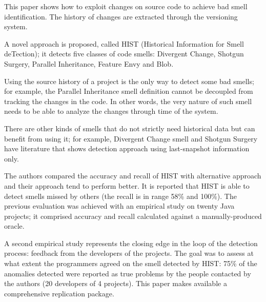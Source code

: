 This paper shows how to exploit changes on source code to achieve bad smell identification. The history of changes are extracted through the versioning system. 

A novel approach is proposed, called HIST (Historical Information for Smell deTection); it detects five classes of code smells: Divergent Change, Shotgun Surgery, Parallel Inheritance, Feature Envy and Blob.


Using the source history of a project is the only way to detect some bad smells; for example, the Parallel Inheritance smell definition cannot be decoupled from tracking the changes in the code. In other words, the very nature of such smell needs to be able to analyze the changes through time of the system.

There are other kinds of smells that do not strictly need historical data but can benefit from using it; for example, Divergent Change smell and Shotgun Surgery have literature that shows detection approach using last-snapshot information only.

The authors compared the accuracy and recall of HIST with alternative approach and their approach tend to perform better. It is reported that HIST is able to detect smells missed by others (the recall is in range 58\% and 100\%). The previous evaluation was achieved with an empirical study on twenty Java projects; it comprised accuracy and recall calculated against a manually-produced oracle.

A second empirical study represents the closing edge in the loop of the detection process: feedback from the developers of the projects. The goal was to assess at what extent the programmers agreed on the smell detected by HIST: 75\% of the anomalies detected were reported as true problems by the people contacted by the authors (20 developers of 4 projects).
This paper makes available a comprehensive replication package.
